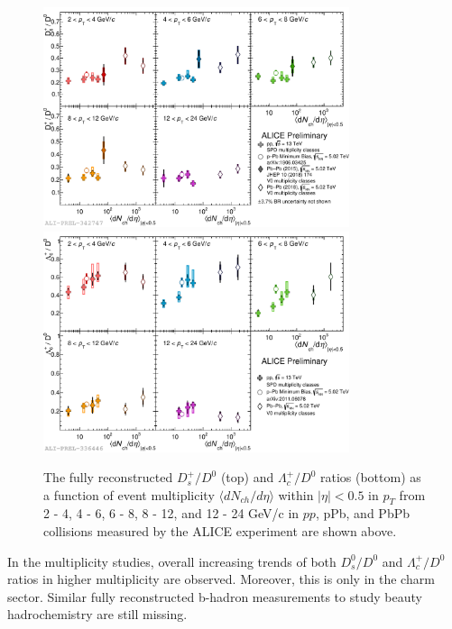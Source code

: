 \begin{figure}[hbtp]
\begin{center}
\includegraphics[width=0.80\textwidth]{Figures/Chapter2/ALICEDsD0Multi.pdf}
\includegraphics[width=0.80\textwidth]{Figures/Chapter2/ALICELambdaD0Multi.pdf}
\caption{The fully reconstructed $D^+_s/D^0$ (top) and $\Lambda_c^+/D^0$ ratios (bottom) as a function of event multiplicity $\langle dN_{ch}/d\eta \rangle$ within $|\eta| < 0.5$ in $p_T$ from 2 - 4, 4 - 6, 6 - 8, 8 - 12, and 12 - 24 GeV/c in $pp$, pPb, and PbPb collisions measured by the ALICE experiment are shown above.}
\label{ALICEMulti}
\end{center}
\end{figure}   



In the multiplicity studies, overall increasing trends of both $D^0_s/D^0$ and $\Lambda_c^+/D^0$ ratios in higher multiplicity are observed. Moreover, this is only in the charm sector. Similar fully reconstructed b-hadron measurements to study beauty hadrochemistry are still missing. 


